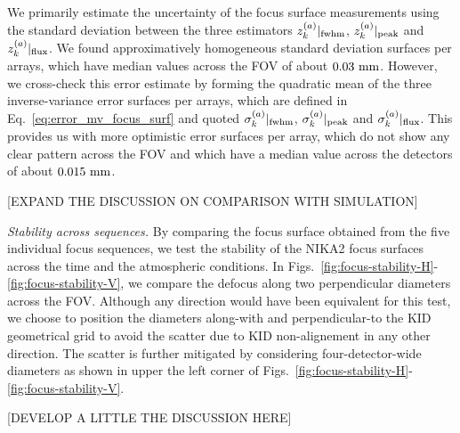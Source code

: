 We primarily estimate the uncertainty of the focus
surface measurements using the standard deviation between the three
estimators $z_k^{(a)}|_{\rm{fwhm}}$, $z_k^{(a)}|_{\rm{peak}}$ and
$z_k^{(a)}|_{\rm{flux}}$. We found approximatively homogeneous
standard deviation surfaces per arrays, which have median values across
the FOV of about $0.03~\rm{mm}$.
However, we cross-check this error estimate by forming the quadratic mean of
the three inverse-variance error surfaces per arrays, which are defined in
Eq.~\ref{eq:error_mv_focus_surf} and quoted
$\sigma_k^{(a)}|_{\rm{fwhm}}$, $\sigma_k^{(a)}|_{\rm{peak}}$ and
$\sigma_k^{(a)}|_{\rm{flux}}$. This provides us with more optimistic
error surfaces per array, which do not show any clear pattern across
the FOV and which have a median value across the detectors of about
$0.015~\rm{mm}$.  


[EXPAND THE DISCUSSION ON COMPARISON WITH SIMULATION]

\emph{Stability across sequences. }
By comparing the focus surface obtained from the five individual focus
sequences, we test the stability of the NIKA2 focus surfaces across
the time and the atmospheric conditions. In
Figs.~\ref{fig:focus-stability-H}-\ref{fig:focus-stability-V}, we compare
the defocus along two perpendicular diameters across the
FOV. Although any direction would have been equivalent for this test, we choose to
position the diameters along-with and perpendicular-to the KID geometrical
grid to avoid the scatter due to KID non-alignement in any other
direction. The scatter is further mitigated by considering
four-detector-wide diameters as shown in upper the left corner of
Figs.~\ref{fig:focus-stability-H}-\ref{fig:focus-stability-V}.

[DEVELOP A LITTLE THE DISCUSSION HERE]


